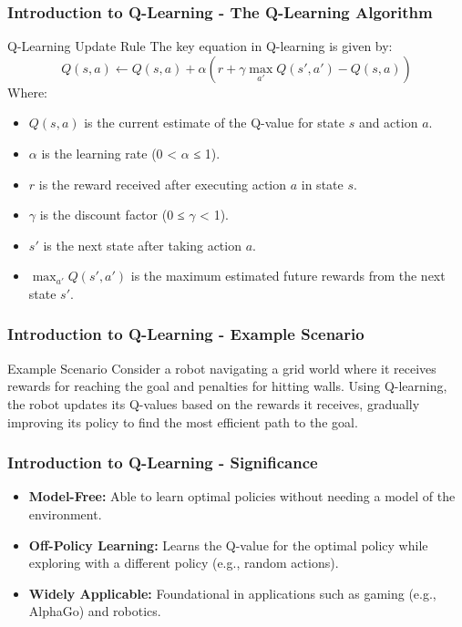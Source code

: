 \documentclass{beamer}
\begin{document}
\begin{frame}[fragile]
    \frametitle{Introduction to Q-Learning - The Q-Learning Algorithm}
    \begin{block}{Q-Learning Update Rule}
        The key equation in Q-learning is given by:
        \begin{equation}
        Q(s, a) \leftarrow Q(s, a) + \alpha \left( r + \gamma \max_{a'} Q(s', a') - Q(s, a) \right)
        \end{equation}
        Where:
        \begin{itemize}
            \item $Q(s, a)$ is the current estimate of the Q-value for state $s$ and action $a$.
            \item $\alpha$ is the learning rate (0 < $\alpha$ ≤ 1).
            \item $r$ is the reward received after executing action $a$ in state $s$.
            \item $\gamma$ is the discount factor (0 ≤ $\gamma$ < 1).
            \item $s'$ is the next state after taking action $a$.
            \item $\max_{a'} Q(s', a')$ is the maximum estimated future rewards from the next state $s'$.
        \end{itemize}
    \end{block}
\end{frame}

\begin{frame}[fragile]
    \frametitle{Introduction to Q-Learning - Example Scenario}
    \begin{block}{Example Scenario}
        Consider a robot navigating a grid world where it receives rewards for reaching the goal and penalties for hitting walls. Using Q-learning, the robot updates its Q-values based on the rewards it receives, gradually improving its policy to find the most efficient path to the goal.
    \end{block}
\end{frame}

\begin{frame}[fragile]
    \frametitle{Introduction to Q-Learning - Significance}
    \begin{itemize}
        \item \textbf{Model-Free:} Able to learn optimal policies without needing a model of the environment.
        \item \textbf{Off-Policy Learning:} Learns the Q-value for the optimal policy while exploring with a different policy (e.g., random actions).
        \item \textbf{Widely Applicable:} Foundational in applications such as gaming (e.g., AlphaGo) and robotics.
    \end{itemize}
\end{frame}
\end{document}
